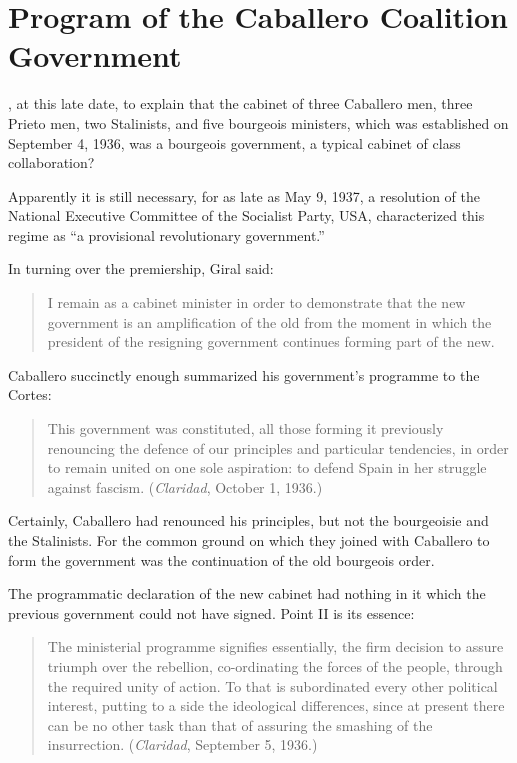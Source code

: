 \chapter{Program of the Caballero Coalition Government}

, at this late date, to explain that the cabinet of three Caballero men, three Prieto men, two Stalinists, and five bourgeois ministers, which was established on September 4, 1936, was a bourgeois government, a typical cabinet of class collaboration?

Apparently it is still necessary, for as late as May 9, 1937, a resolution of the National Executive Committee of the Socialist Party, USA, characterized this regime as ``a provisional revolutionary government.''

In turning over the premiership, Giral said:

\begin{quotation}
  I remain as a cabinet minister in order to demonstrate that the new government is an amplification of the old from the moment in which the president of the resigning government continues forming part of the new.
\end{quotation}

Caballero succinctly enough summarized his government’s programme to the Cortes:

\begin{quotation}
  This government was constituted, all those forming it previously renouncing the defence of our principles and particular tendencies, in order to remain united on one sole aspiration: to defend Spain in her struggle against fascism. (\emph{Claridad}, October 1, 1936.)
\end{quotation}

Certainly, Caballero had renounced his principles, but not the bourgeoisie and the Stalinists. For the common ground on which they joined with Caballero to form the government was the continuation of the old bourgeois order.

The programmatic declaration of the new cabinet had nothing in it which the previous government could not have signed. Point II is its essence:

\begin{quotation}
  The ministerial programme signifies essentially, the firm decision to assure triumph over the rebellion, co-ordinating the forces of the people, through the required unity of action. To that is subordinated every other political interest, putting to a side the ideological differences, since at present there can be no other task than that of assuring the smashing of the insurrection. (\emph{Claridad}, September 5, 1936.)
\end{quotation}


